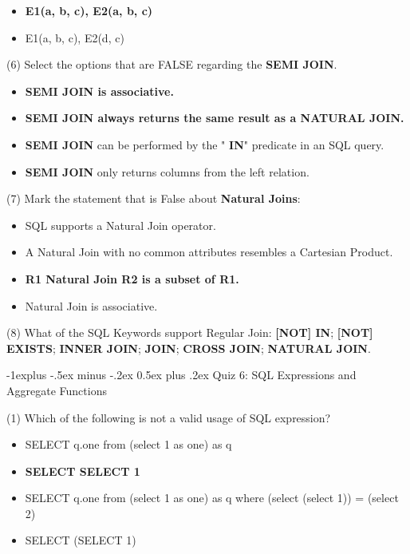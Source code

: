 \documentclass[10pt,landscape]{article}
\makeatletter
\newcommand{\sql}[1]{{\color{cyan} \textbf{#1}}}
\newcommand{\ans}[1]{{\color{purple} \textbf{#1}}}
\renewcommand{\subsection}{\@startsection{subsection}{2}{0mm}%
                                {-1explus -.5ex minus -.2ex}%
                                {0.5ex plus .2ex}%
                                {\normalfont\normalsize\bfseries}}
\makeatother
\begin{document}
\begin{multicols}{4}
\begin{itemize}
	\item \ans{E1(a, b, c), E2(a, b, c)}
	\item E1(a, b, c), E2(d, c)
\end{itemize}

(6) Select the options that are FALSE regarding the \sql{SEMI JOIN}.

\begin{itemize}
	\item \ans{\sql{SEMI JOIN} is associative.} 
	\item \ans{\sql{SEMI JOIN} always returns the same result as a \sql{NATURAL JOIN}.} 
	\item \sql{SEMI JOIN} can be performed by the "\sql{IN}" predicate in an SQL query. 
	\item \sql{SEMI JOIN} only returns columns from the left relation. 
\end{itemize}

(7) Mark the statement that is False about \sql{Natural Joins}:

\begin{itemize}
	\item SQL supports a Natural Join operator. 
	\item A Natural Join with no common attributes resembles a Cartesian Product. 
	\item \ans{R1 Natural Join R2 is a subset of R1.} 
	\item Natural Join is associative. 
\end{itemize}

(8) What of the SQL Keywords support Regular Join: \sql{[NOT] IN}; \sql{[NOT] EXISTS}; \ans{INNER JOIN}; \ans{JOIN}; \ans{CROSS JOIN}; \ans{NATURAL JOIN}.
 
\subsection{Quiz 6: SQL Expressions and Aggregate Functions}

(1) Which of the following is not a valid usage of SQL expression?

\begin{itemize}
	\item SELECT q.one from (select 1 as one) as q
	\item \ans{SELECT SELECT 1}
	\item SELECT q.one from (select 1 as one) as q where (select (select 1)) = (select 2)
	\item SELECT (SELECT 1)
\end{itemize}


\end{multicols}
\end{document}
